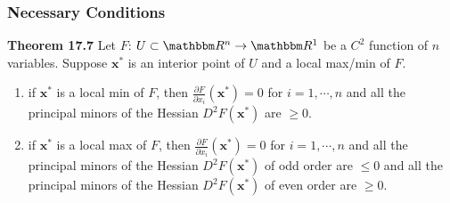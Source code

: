 \documentclass[9pt,aspectratio=169]{beamer}
\newcommand{\RR}{\mathbbm R}
\begin{document}
\begin{frame}
	\frametitle{Necessary Conditions}
	\begin{block}{\textbf{Theorem 17.7}}	
		Let $F$: $U\subset \RR^n \rightarrow \RR^1$ be a $C^2$ function of
        $n$ variables. Suppose $\mathbf{x}^*$ is an interior point of $U$ and
        a local max/min of $F$.
        \begin{enumerate}
            \item[(a)] if $\mathbf{x^*}$ is a local min of $F$, then
            $\frac{\partial F}{\partial x_i}(\mathbf{x^*}) = 0$ for
            $i=1,\cdots,n$ and all the principal minors of the Hessian
            $D^2F(\mathbf{x^*})$ are $\geq 0$.
            \item[(b)] if $\mathbf{x^*}$ is a local max of $F$, then
            $\frac{\partial F}{\partial x_i}(\mathbf{x^*}) = 0$ for
            $i=1,\cdots,n$ and all the principal minors of the Hessian
            $D^2F(\mathbf{x^*})$ of odd order are $\leq 0$ and all the
            principal minors of the Hessian $D^2F(\mathbf{x^*})$ of even
            order are $\geq 0$.
        \end{enumerate}
	\end{block}
\end{frame}
\end{document}
